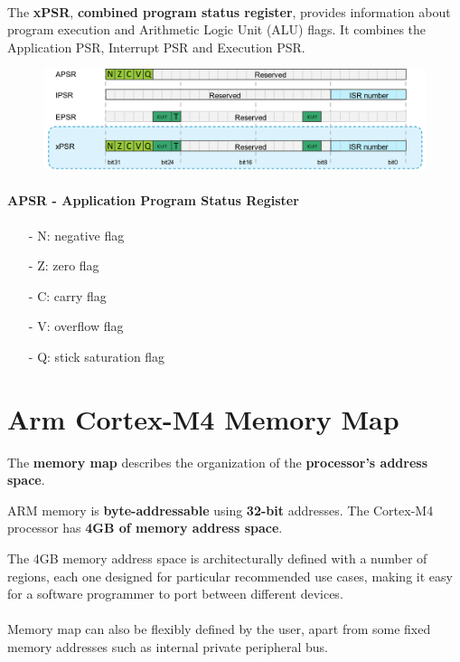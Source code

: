 \paragraph{}
The \textbf{xPSR}, \textbf{combined program status register}, provides information about program execution and
Arithmetic Logic Unit (ALU) flags. It combines the Application PSR, Interrupt PSR and Execution PSR.

\begin{figure}[H]
    \centering
    \includegraphics[width=1\linewidth]{img/image19.png}
\end{figure}

\paragraph{APSR - Application Program Status Register}

\begin{itemize}
    \item[-] N: negative flag
    \item[-] Z: zero flag
    \item[-] C: carry flag
    \item[-] V: overflow flag
    \item[-] Q: stick saturation flag
\end{itemize}


\section{Arm Cortex-M4 Memory Map}

The \textbf{memory map} describes the organization of the \textbf{processor’s address space}.

ARM memory is \textbf{byte-addressable} using \textbf{32-bit} addresses. The Cortex-M4 processor has \textbf{4GB of memory address space}.

The 4GB memory address space is architecturally defined with a number of regions, each one designed
for particular recommended use cases, making it easy for a software programmer to port between
different devices.

\paragraph{}
Memory map can also be flexibly defined by the user, apart from some fixed memory addresses such as
internal private peripheral bus.


